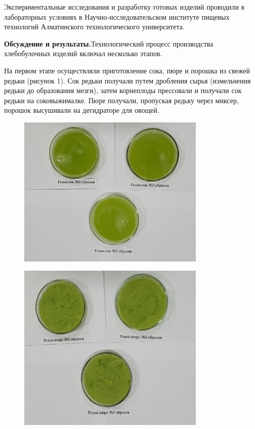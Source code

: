 Экспериментальные исследования и разработку готовых изделий проводили в
лабораторных условиях в Научно-исследовательском институте пищевых
технологий Алматинского технологического университета.

{\bfseries Обсуждение и результаты.}Технологический процесс производства
хлебобулочных изделий включал несколько этапов.

На первом этапе осуществляли приготовление сока, пюре и порошка из
свежей редьки (рисунок 1). Сок редьки получали путем дробления сырья
(измельчения редьки до образования мезги), затем корнеплоды прессовали и
получали сок редьки на соковыжималке. Пюре получали, пропуская редьку
через миксер, порошок высушивали на дегидраторе для овощей.


\begin{figure}[H]
	\centering
	\includegraphics[width=0.8\textwidth]{media/pish/image58}
	\caption*{}
\end{figure}


\begin{figure}[H]
	\centering
	\includegraphics[width=0.8\textwidth]{media/pish/image59}
	\caption*{}
\end{figure}


